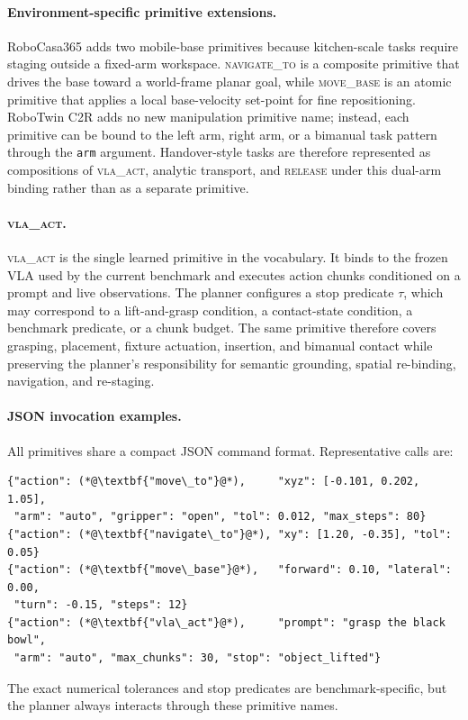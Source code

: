 \documentclass{article}
\begin{document}
\paragraph{Environment-specific primitive extensions.}
RoboCasa365 adds two mobile-base primitives because kitchen-scale tasks require staging outside a fixed-arm workspace. \textsc{navigate\_to} is a composite primitive that drives the base toward a world-frame planar goal, while \textsc{move\_base} is an atomic primitive that applies a local base-velocity set-point for fine repositioning. RoboTwin C2R adds no new manipulation primitive name; instead, each primitive can be bound to the left arm, right arm, or a bimanual task pattern through the \texttt{arm} argument. Handover-style tasks are therefore represented as compositions of \textsc{vla\_act}, analytic transport, and \textsc{release} under this dual-arm binding rather than as a separate primitive.

\paragraph{\textsc{vla\_act}.}
\textsc{vla\_act} is the single learned primitive in the vocabulary. It binds to the frozen VLA used by the current benchmark and executes action chunks conditioned on a prompt and live observations. The planner configures a stop predicate $\tau$, which may correspond to a lift-and-grasp condition, a contact-state condition, a benchmark predicate, or a chunk budget. The same primitive therefore covers grasping, placement, fixture actuation, insertion, and bimanual contact while preserving the planner's responsibility for semantic grounding, spatial re-binding, navigation, and re-staging.

\paragraph{JSON invocation examples.}
All primitives share a compact JSON command format. Representative calls are:
\begin{lstlisting}
{"action": (*@\textbf{"move\_to"}@*),     "xyz": [-0.101, 0.202, 1.05],
 "arm": "auto", "gripper": "open", "tol": 0.012, "max_steps": 80}
{"action": (*@\textbf{"navigate\_to"}@*), "xy": [1.20, -0.35], "tol": 0.05}
{"action": (*@\textbf{"move\_base"}@*),   "forward": 0.10, "lateral": 0.00,
 "turn": -0.15, "steps": 12}
{"action": (*@\textbf{"vla\_act"}@*),     "prompt": "grasp the black bowl",
 "arm": "auto", "max_chunks": 30, "stop": "object_lifted"}
\end{lstlisting}
The exact numerical tolerances and stop predicates are benchmark-specific, but the planner always interacts through these primitive names.
\end{document}
